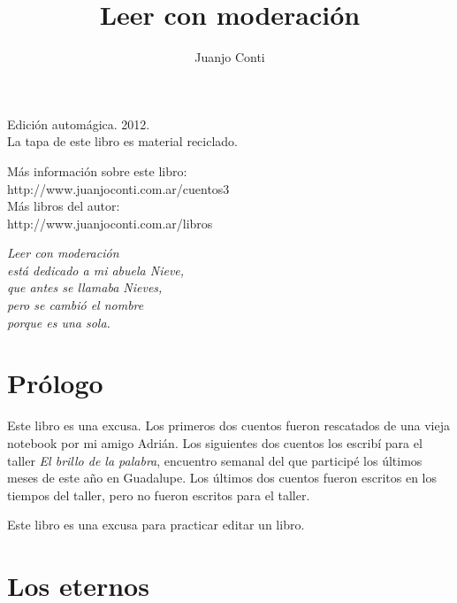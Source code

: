 \documentclass[11pt,twoside,openright,a6paper]{book}
\title{Leer con moderación}
\author{Juanjo Conti}
\date{}
\begin{document}
\pagestyle{plain}

\maketitle

\cleardoublepage

\thispagestyle{empty}
\noindent
Edición automágica. 2012.\\
La tapa de este libro es material reciclado.

\vfill

\noindent
Más información sobre este libro:\\
http://www.juanjoconti.com.ar/cuentos3\\

\noindent
Más libros del autor:\\
http://www.juanjoconti.com.ar/libros

\cleardoublepage

\vfill\noindent
\begin{flushright}
\emph{
\emph{Leer con moderación}\\
está dedicado a mi abuela Nieve,\\
que antes se llamaba Nieves,\\
pero se cambió el nombre\\
porque es una sola.}
\end{flushright}

\cleardoublepage

\renewcommand*\contentsname{Índice}

\tableofcontents

\chapter*{Prólogo}

Este libro es una excusa. Los primeros dos cuentos fueron rescatados de una vieja notebook por mi amigo Adrián.
Los siguientes dos cuentos los escribí para el taller \emph{El brillo de la pala\-bra}, encuentro semanal del que participé los últimos
meses de este año en Guadalupe. Los últimos dos cuentos fueron escritos en los tiempos del taller, pero no fueron escritos para el taller.

Este libro es una excusa para practicar editar un libro.

\chapter*{Los eternos}
\end{document}
